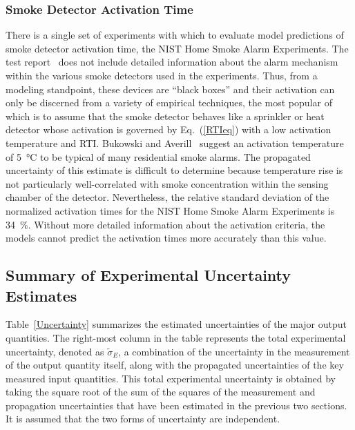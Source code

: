\subsubsection{Smoke Detector Activation Time}

There is a single set of experiments with which to evaluate model predictions of smoke detector activation time, the NIST Home Smoke Alarm Experiments. The test report~\cite{Bukowski:1} does not include detailed information about the alarm mechanism within the various smoke detectors used in the experiments. Thus, from a modeling standpoint, these devices are ``black boxes'' and their activation can only be discerned from a variety of empirical techniques, the most popular of which is to assume that the smoke detector behaves like a sprinkler or heat detector whose activation is governed by Eq.~(\ref{RTIeq}) with a low activation temperature and RTI. Bukowski and Averill~\cite{Bukowski:2} suggest an activation temperature of 5~\unit{\degreeCelsius} to be typical of many residential smoke alarms. The propagated uncertainty of this estimate is difficult to determine because temperature rise is not particularly well-correlated with smoke concentration within the sensing chamber of the detector. Nevertheless, the relative standard deviation of the normalized activation times for the NIST Home Smoke Alarm Experiments is 34~\%. Without more detailed information about the activation criteria, the models cannot predict the activation times more accurately than this value.

\subsection{Summary of Experimental Uncertainty Estimates}

Table~\ref{Uncertainty} summarizes the estimated uncertainties of the major output quantities. The right-most column in the table represents the total experimental uncertainty, denoted as $\widetilde{\sigma}_E$, a combination of the uncertainty in the measurement of the output quantity itself, along with the propagated uncertainties of the key measured input quantities. This total experimental uncertainty is obtained by taking the square root of the sum of the squares of the measurement and propagation uncertainties that have been estimated in the previous two sections. It is assumed that the two forms of uncertainty are independent.

